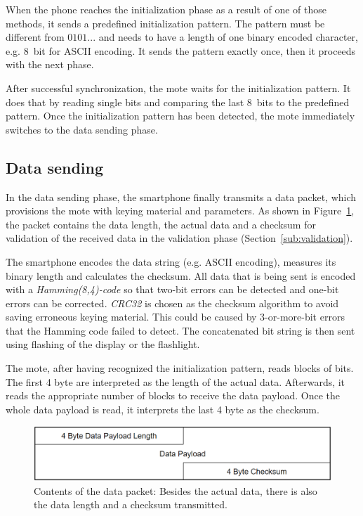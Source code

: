 \documentclass{sig-alternate} %
\begin{document}
When the phone reaches the initialization phase as a result of one of those methods, it sends a predefined initialization pattern.
The pattern must be different from $0101...$ and needs to have a length of one binary encoded character, e.g. 8~bit for ASCII encoding.
It sends the pattern exactly once, then it proceeds with the next phase.

After successful synchronization, the mote waits for the initialization pattern.
It does that by reading single bits and comparing the last 8~bits to the predefined pattern.
Once the initialization pattern has been detected, the mote immediately switches to the data sending phase.

\subsection{Data sending}
\label{sub:data_sending}

In the data sending phase, the smartphone finally transmits a data packet, which provisions the mote with keying material and parameters.
As shown in Figure~\ref{fig:data_packet}, the packet contains the data length, the actual data and a checksum for validation of the received data in the validation phase (Section~\ref{sub:validation}).

The smartphone encodes the data string (e.g. ASCII encoding), measures its binary length and calculates the checksum.
All data that is being sent is encoded with a \textit{Hamming(8,4)-code} so that two-bit errors can be detected and one-bit errors can be corrected.
\textit{CRC32} is chosen as the checksum algorithm to avoid saving erroneous keying material.
This could be caused by 3-or-more-bit errors that the Hamming code failed to detect.
The concatenated bit string is then sent using flashing of the display or the flashlight.

The mote, after having recognized the initialization pattern, reads blocks of bits.
The first 4 byte are interpreted as the length of the actual data.
Afterwards, it reads the appropriate number of blocks to receive the data payload.
Once the whole data payload is read, it interprets the last 4 byte as the checksum.

\begin{figure}
	\centering
	\includegraphics[scale=.3]{images/data_packet.png}
	\caption{Contents of the data packet: Besides the actual data, there is also the data length and a checksum transmitted.}
	\label{fig:data_packet}
\end{figure}
\end{document}
